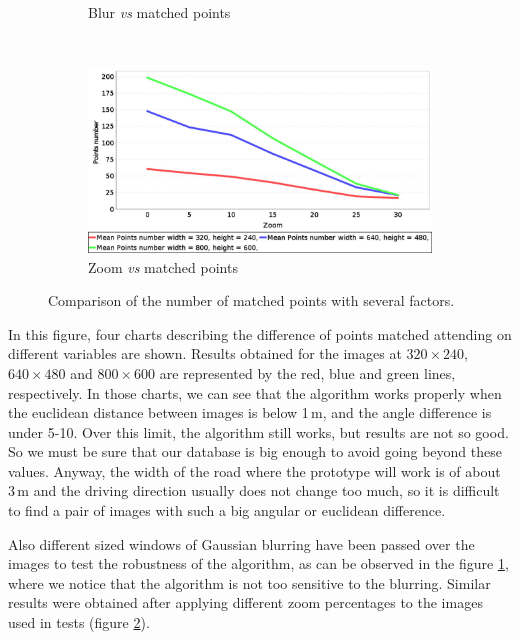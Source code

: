 \begin{figure}[t]
\begin{subfigure}[b]{0.45\textwidth}
	  \caption{Blur \emph{vs} matched points}\label{fig:cp01_blur_vs_matched}
        \end{subfigure}%
        ~
        \begin{subfigure}[b]{0.45\textwidth}
	    \includegraphics[width=\textwidth]{zoomVsMatches}
	  \caption{Zoom \emph{vs} matched points}\label{fig:cp01_zoom_vs_matched}
        \end{subfigure}%
        \caption{Comparison of the number of matched points with several factors.}\label{fig:cp01_matching_results}
\end{figure}

In this figure, four charts describing the difference of points matched attending on different variables are shown. Results obtained for the images at $320 \times 240$, $640 \times 480$ and $800 \times 600$ are represented by the red, blue and green lines, respectively. In those charts, we can see that the algorithm works properly when the euclidean distance between images is below 1\,m, and the angle difference is under 5-10\textdegree. Over this limit, the algorithm still works, but results are not so good. So we must be sure that our database is big enough to avoid going beyond these values. Anyway, the width of the road where the prototype will work is of about 3\,m and the driving direction usually does not change too much, so it is difficult to find a pair of images with such a big angular or euclidean difference.

Also different sized windows of Gaussian blurring have been passed over the images to test the robustness of the algorithm, as can be observed in the figure \ref{fig:cp01_blur_vs_matched}, where we notice that the algorithm is not too sensitive to the blurring. Similar results were obtained after applying different zoom percentages to the images used in tests (figure \ref{fig:cp01_zoom_vs_matched}).

